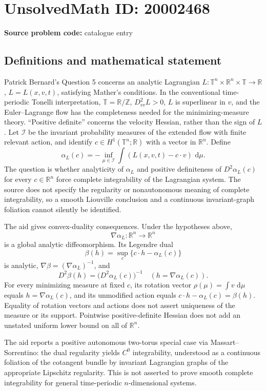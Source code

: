 \documentclass[11pt]{article}
\newcommand{\Z}{\mathbb{Z}}
\newcommand{\R}{\mathbb{R}}
\newcommand{\dd}{\,\mathrm{d}}
\begin{document}
\section*{UnsolvedMath ID: 20002468}
\textbf{Source problem code:} catalogue entry
\subsection{Definitions and mathematical statement}
Patrick Bernard's Question 5 concerns an analytic Lagrangian $L:\mathbb T^n\times\R^n\times\mathbb T\to\R$, $L=L(x,v,t)$, satisfying Mather's conditions. In the conventional time-periodic Tonelli interpretation, $\mathbb T=\R/\Z$, $D^2_{vv}L>0$, $L$ is superlinear in $v$, and the Euler--Lagrange flow has the completeness needed for the minimizing-measure theory. ``Positive definite'' concerns the velocity Hessian, rather than the sign of $L$. Let $\mathcal I$ be the invariant probability measures of the extended flow with finite relevant action, and identify $c\in H^1(\mathbb T^n;\R)$ with a vector in $\R^n$. Define
\[
\alpha_L(c)=-\inf_{\mu\in\mathcal I}\int(L(x,v,t)-c\cdot v)\,\dd\mu.
\]
The question is whether analyticity of $\alpha_L$ and positive definiteness of $D^2\alpha_L(c)$ for every $c\in\R^n$ force complete integrability of the Lagrangian system. The source does not specify the regularity or nonautonomous meaning of complete integrability, so a smooth Liouville conclusion and a continuous invariant-graph foliation cannot silently be identified.

The aid gives convex-duality consequences. Under the hypotheses above,
\[
\nabla\alpha_L:\R^n\to\R^n
\]
is a global analytic diffeomorphism. Its Legendre dual
\[
\beta(h)=\sup_c\{c\cdot h-\alpha_L(c)\}
\]
is analytic, $\nabla\beta=(\nabla\alpha_L)^{-1}$, and
\[
D^2\beta(h)=\bigl(D^2\alpha_L(c)\bigr)^{-1}\quad(h=\nabla\alpha_L(c)).
\]
For every minimizing measure at fixed $c$, its rotation vector $\rho(\mu)=\int v\,\dd\mu$ equals $h=\nabla\alpha_L(c)$, and its unmodified action equals $c\cdot h-\alpha_L(c)=\beta(h)$. Equality of rotation vectors and actions does not assert uniqueness of the measure or its support. Pointwise positive-definite Hessian does not add an unstated uniform lower bound on all of $\R^n$.

The aid reports a positive autonomous two-torus special case via Massart--Sorrentino: the dual regularity yields $C^0$ integrability, understood as a continuous foliation of the cotangent bundle by invariant Lagrangian graphs of the appropriate Lipschitz regularity. This is not asserted to prove smooth complete integrability for general time-periodic $n$-dimensional systems.
\end{document}
